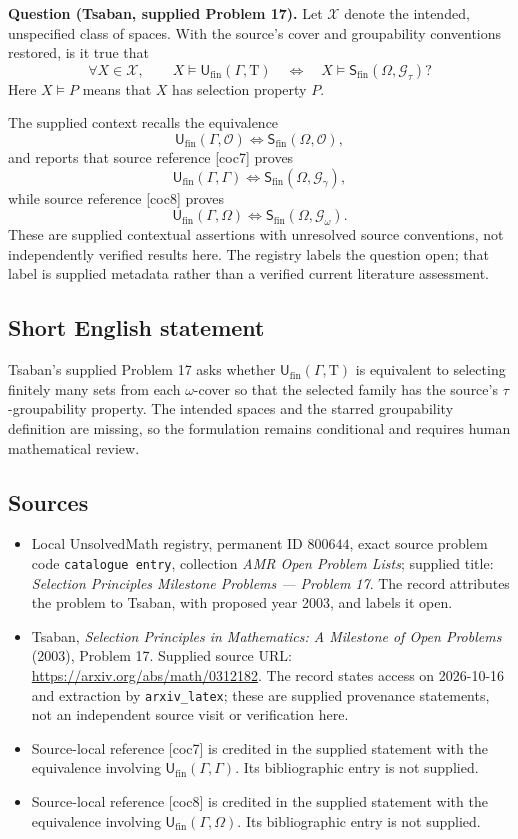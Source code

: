 \documentclass[11pt]{article}
\begin{document}
\textbf{Question (Tsaban, supplied Problem 17).} Let \(\mathscr X\) denote the intended, unspecified class of spaces. With the source's cover and groupability conventions restored, is it true that
\[
 \forall X\in\mathscr X,\qquad
 X\models\mathsf U_{\mathrm{fin}}(\Gamma,\mathrm T)
 \quad\Longleftrightarrow\quad
 X\models\mathsf S_{\mathrm{fin}}(\Omega,\mathscr G_\tau)?
\]
Here \(X\models P\) means that \(X\) has selection property \(P\).

The supplied context recalls the equivalence
\[
 \mathsf U_{\mathrm{fin}}(\Gamma,\mathcal O)
 \Longleftrightarrow
 \mathsf S_{\mathrm{fin}}(\Omega,\mathcal O),
\]
and reports that source reference [coc7] proves
\[
 \mathsf U_{\mathrm{fin}}(\Gamma,\Gamma)
 \Longleftrightarrow
 \mathsf S_{\mathrm{fin}}(\Omega,\mathscr G_\gamma),
\]
while source reference [coc8] proves
\[
 \mathsf U_{\mathrm{fin}}(\Gamma,\Omega)
 \Longleftrightarrow
 \mathsf S_{\mathrm{fin}}(\Omega,\mathscr G_\omega).
\]
These are supplied contextual assertions with unresolved source conventions, not independently verified results here. The registry labels the question open; that label is supplied metadata rather than a verified current literature assessment.
\subsection{Short English statement}
Tsaban's supplied Problem 17 asks whether \(\mathsf U_{\mathrm{fin}}(\Gamma,\mathrm T)\) is equivalent to selecting finitely many sets from each \(\omega\)-cover so that the selected family has the source's \(\tau\)-groupability property. The intended spaces and the starred groupability definition are missing, so the formulation remains conditional and requires human mathematical review.
\subsection{Sources}
\begin{itemize}
\item Local UnsolvedMath registry, permanent ID \(800644\), exact source problem code \texttt{catalogue entry}, collection \emph{AMR Open Problem Lists}; supplied title: \emph{Selection Principles Milestone Problems --- Problem 17}. The record attributes the problem to Tsaban, with proposed year 2003, and labels it open.
\item Tsaban, \emph{Selection Principles in Mathematics: A Milestone of Open Problems} (2003), Problem 17. Supplied source URL: \url{https://arxiv.org/abs/math/0312182}. The record states access on 2026-10-16 and extraction by \texttt{arxiv\_latex}; these are supplied provenance statements, not an independent source visit or verification here.
\item Source-local reference [coc7] is credited in the supplied statement with the equivalence involving \(\mathsf U_{\mathrm{fin}}(\Gamma,\Gamma)\). Its bibliographic entry is not supplied.
\item Source-local reference [coc8] is credited in the supplied statement with the equivalence involving \(\mathsf U_{\mathrm{fin}}(\Gamma,\Omega)\). Its bibliographic entry is not supplied.
\end{itemize}
\end{document}
